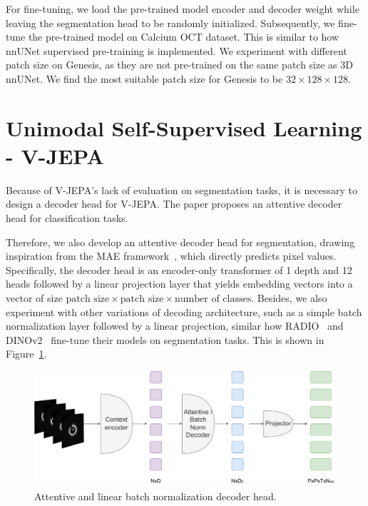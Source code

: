 \documentclass[a4paper,11pt,oneside]{report}
\begin{document}
For fine-tuning, we load the pre-trained model encoder and decoder weight while leaving the segmentation head to be randomly initialized. Subsequently, we fine-tune the pre-trained model on Calcium OCT dataset. This is similar to how nnUNet supervised pre-training is implemented. We experiment with different patch size on Genesis, as they are not pre-trained on the same patch size as 3D nnUNet. We find the most suitable patch size for Genesis to be $32\times 128\times 128$.

\section{Unimodal Self-Supervised Learning - V-JEPA}\label{sec:implementation:vjepa}
Because of V-JEPA's lack of evaluation on segmentation tasks, it is necessary to design a decoder head for V-JEPA. The paper proposes an attentive decoder head for classification tasks. 

Therefore, we also develop an attentive decoder head for segmentation, drawing inspiration from the MAE framework~\cite{He2022}, which directly predicts pixel values. Specifically, the decoder head is an encoder-only transformer of 1 depth and 12 heads followed by a linear projection layer that yields embedding vectors into a vector of size \(\text{patch size} \times \text{patch size} \times \text{number of classes}\). Besides, we also experiment with other variations of decoding architecture, such as a simple batch normalization layer followed by a linear projection, similar how RADIO~\cite{Ranzinger2024RADIO} and DINOv2~\cite{Oquab2024dinov} fine-tune their models on segmentation tasks. This is shown in Figure~\ref{fig:vjepa-attentive-and-batchnorm-decoder-head}. 

\begin{figure}[ht]
    \centering
    \includegraphics[width=0.6\linewidth]{figures/fig_implementation_vjepa_attentive_and_batchnorm_decoder.pdf}
    \caption{Attentive and linear batch normalization decoder head.}
    \label{fig:vjepa-attentive-and-batchnorm-decoder-head}
\end{figure}%
\end{document}
